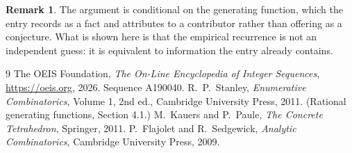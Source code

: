 \documentclass[11pt,a4paper]{article}
\theoremstyle{plain}
\theoremstyle{definition}
\newtheorem{remark}[theorem]{Remark}
\begin{document}
\begin{remark}
The argument is conditional on the generating function, which the entry records as a fact and
attributes to a contributor rather than offering as a conjecture. What is shown here is that
the empirical recurrence is not an independent guess: it is equivalent to information the
entry already contains.
\end{remark}

\begin{thebibliography}{9}
 The OEIS Foundation, \emph{The On-Line Encyclopedia of Integer
Sequences}, \url{https://oeis.org}, 2026. Sequence A190040.
 R.~P.~Stanley, \emph{Enumerative Combinatorics}, Volume 1, 2nd ed.,
Cambridge University Press, 2011. (Rational generating functions, Section 4.1.)
 M.~Kauers and P.~Paule, \emph{The Concrete Tetrahedron}, Springer, 2011.
 P.~Flajolet and R.~Sedgewick, \emph{Analytic Combinatorics}, Cambridge
University Press, 2009.
\end{thebibliography}
\end{document}
